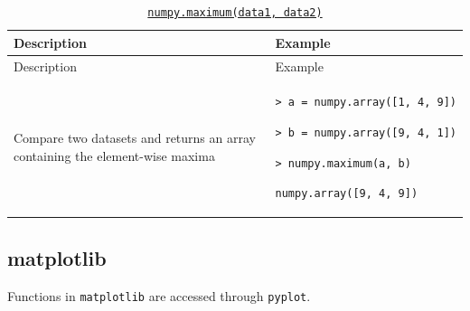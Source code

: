 \documentclass[10pt,a4paperpaper,]{article}
\begin{document}
\begin{longtable}[]{@{}ll@{}}
\caption{\href{http://docs.scipy.org/doc/numpy-1.10.0/reference/generated/numpy.maximum.html}{\texttt{numpy.maximum(data1,\ data2)}}}\tabularnewline
\toprule
\begin{minipage}[b]{0.47\columnwidth}\raggedright\strut
Description
\strut\end{minipage} &
\begin{minipage}[b]{0.47\columnwidth}\raggedright\strut
Example
\strut\end{minipage}\tabularnewline
\midrule
\endfirsthead
\toprule
\begin{minipage}[b]{0.47\columnwidth}\raggedright\strut
Description
\strut\end{minipage} &
\begin{minipage}[b]{0.47\columnwidth}\raggedright\strut
Example
\strut\end{minipage}\tabularnewline
\midrule
\endhead
\begin{minipage}[t]{0.47\columnwidth}\raggedright\strut
Compare two datasets and returns an array containing the element-wise
maxima
\strut\end{minipage} &
\begin{minipage}[t]{0.47\columnwidth}\raggedright\strut
\texttt{\textgreater{}\ a\ =\ numpy.array({[}1,\ 4,\ 9{]})}

\texttt{\textgreater{}\ b\ =\ numpy.array({[}9,\ 4,\ 1{]})}

\texttt{\textgreater{}\ numpy.maximum(a,\ b)}

\texttt{numpy.array({[}9,\ 4,\ 9{]})}
\strut\end{minipage}\tabularnewline
\bottomrule
\end{longtable}

\subsection{matplotlib}\label{matplotlib}

Functions in \texttt{matplotlib} are accessed through \texttt{pyplot}.
\end{document}
